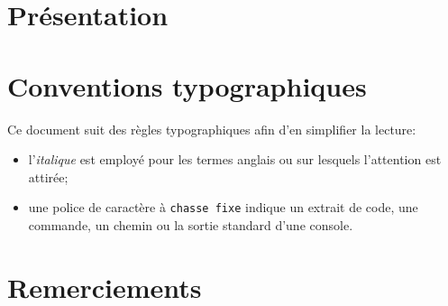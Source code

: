 \section*{Présentation}

\section*{Conventions typographiques}\label{title-avantpropos}

\noindent Ce document suit des règles typographiques afin d'en simplifier la lecture:

\begin{itemize}
\item l'\textit{italique} est employé pour les termes anglais ou sur lesquels l'attention est attirée;
\item une police de caractère à \texttt{chasse fixe} indique un extrait de code, une commande, un chemin ou la sortie standard d'une console.
\end{itemize}

\section*{Remerciements}